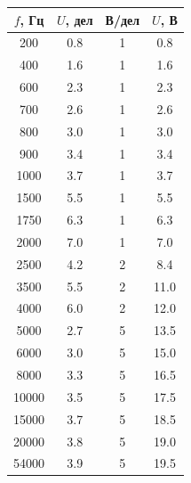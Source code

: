 \documentclass[14pt]{article}
\begin{document}
\begin{center}
\begin{tabular}{|c|c|c|c|}
\hline
$f$, Гц		&	$U$, дел	&	В/дел	&	$U$, В	\\
\hline
200			&	0.8			&	1		&	0.8\\
\hline
400			&	1.6			&	1		&	1.6\\
\hline
600			&	2.3			&	1		&	2.3\\
\hline
700			&	2.6			&	1		&	2.6\\
\hline
800			&	3.0			&	1		&	3.0\\
\hline
900			&	3.4			&	1		&	3.4\\
\hline
1000		&	3.7			&	1		&	3.7\\
\hline
1500		&	5.5			&	1		&	5.5\\
\hline
1750		&	6.3			&	1		&	6.3\\
\hline
2000		&	7.0			&	1		&	7.0\\
\hline
2500		&	4.2			&	2		&	8.4\\
\hline
3500		&	5.5			&	2		&	11.0\\
\hline
4000		&	6.0			&	2		&	12.0\\
\hline
5000		&	2.7			&	5		&	13.5\\
\hline
6000		&	3.0			&	5		&	15.0\\
\hline
8000		&	3.3			&	5		&	16.5\\
\hline
10000		&	3.5			&	5		&	17.5\\
\hline
15000		&	3.7			&	5		&	18.5\\
\hline
20000		&	3.8			&	5		&	19.0\\
\hline
54000		&	3.9			&	5		&	19.5\\
\hline
\end{tabular}
\end{center}
\end{document}
